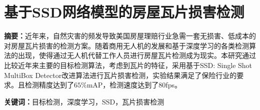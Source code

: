 \section*{基于SSD网络模型的房屋瓦片损害检测}
\par \noindent
\textbf{\songti {}摘要：}近年来，自然灾害的频发导致美国房屋理赔行业急需一套无损害、低成本的对房屋瓦片损害的检测方案。随着商用无人机的发展和基于深度学习的各类检测算法的出现，使得通过无人机代替工作人员进行房屋瓦片检测成为现实。本研究通过比较近年来主要的目标检测算法，考虑到瓦片的特征，采用基于SSD: Single Shot MultiBox Detector\cite{ssd}改进算法进行瓦片损害检测，实验结果满足了保险行业的要求。且检测精度达到了$65\%$mAP，检测速度达到了80fps。

\par \noindent
\textbf{\songti {}关键词：}{\kaishu {}目标检测，深度学习，SSD，瓦片损害检测}

